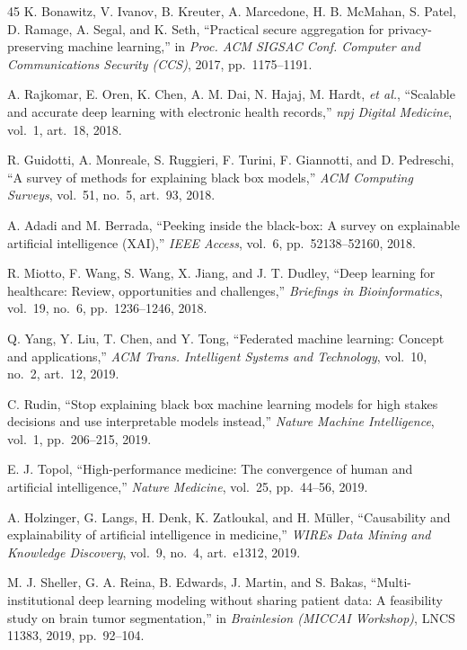 \documentclass[11pt,a4paper]{article}
\begin{document}
\begin{thebibliography}{45}
 K. Bonawitz, V. Ivanov, B. Kreuter, A. Marcedone, H. B. McMahan,
S. Patel, D. Ramage, A. Segal, and K. Seth, ``Practical secure aggregation for
privacy-preserving machine learning,'' in \emph{Proc. ACM SIGSAC Conf. Computer
and Communications Security (CCS)}, 2017, pp.~1175--1191.

 A. Rajkomar, E. Oren, K. Chen, A. M. Dai, N. Hajaj, M. Hardt,
\emph{et al.}, ``Scalable and accurate deep learning with electronic health
records,'' \emph{npj Digital Medicine}, vol.~1, art.~18, 2018.

 R. Guidotti, A. Monreale, S. Ruggieri, F. Turini, F. Giannotti,
and D. Pedreschi, ``A survey of methods for explaining black box models,''
\emph{ACM Computing Surveys}, vol.~51, no.~5, art.~93, 2018.

 A. Adadi and M. Berrada, ``Peeking inside the black-box: A
survey on explainable artificial intelligence (XAI),'' \emph{IEEE Access},
vol.~6, pp.~52138--52160, 2018.

 R. Miotto, F. Wang, S. Wang, X. Jiang, and J. T. Dudley, ``Deep
learning for healthcare: Review, opportunities and challenges,'' \emph{Briefings
in Bioinformatics}, vol.~19, no.~6, pp.~1236--1246, 2018.

 Q. Yang, Y. Liu, T. Chen, and Y. Tong, ``Federated machine
learning: Concept and applications,'' \emph{ACM Trans. Intelligent Systems and
Technology}, vol.~10, no.~2, art.~12, 2019.

 C. Rudin, ``Stop explaining black box machine learning models
for high stakes decisions and use interpretable models instead,'' \emph{Nature
Machine Intelligence}, vol.~1, pp.~206--215, 2019.

 E. J. Topol, ``High-performance medicine: The convergence of
human and artificial intelligence,'' \emph{Nature Medicine}, vol.~25,
pp.~44--56, 2019.

 A. Holzinger, G. Langs, H. Denk, K. Zatloukal, and H. M\"uller,
``Causability and explainability of artificial intelligence in medicine,''
\emph{WIREs Data Mining and Knowledge Discovery}, vol.~9, no.~4, art.~e1312,
2019.

 M. J. Sheller, G. A. Reina, B. Edwards, J. Martin, and S. Bakas,
``Multi-institutional deep learning modeling without sharing patient data: A
feasibility study on brain tumor segmentation,'' in \emph{Brainlesion (MICCAI
Workshop)}, LNCS 11383, 2019, pp.~92--104.


\end{thebibliography}
\end{document}
